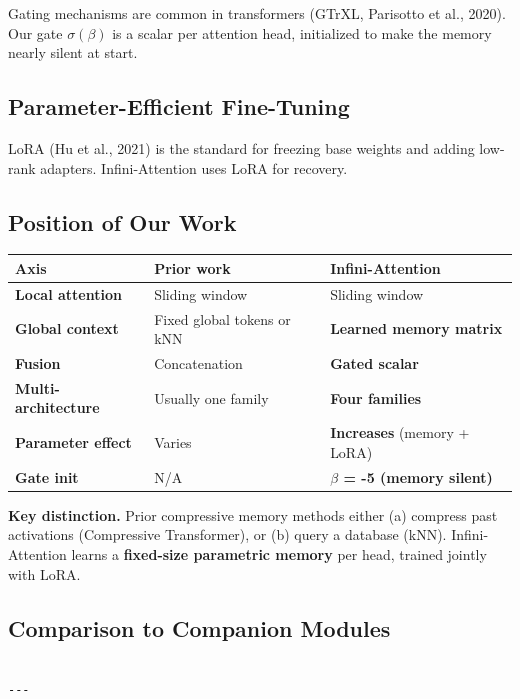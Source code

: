 Gating mechanisms are common in transformers (GTrXL, Parisotto et al., 2020). 
Our gate $\sigma(\beta)$ is a scalar per attention head, initialized to make 
the memory nearly silent at start.

\subsection{Parameter-Efficient Fine-Tuning}

LoRA (Hu et al., 2021) is the standard for freezing base weights and adding 
low-rank adapters. Infini-Attention uses LoRA for recovery.

\subsection{Position of Our Work}

\begin{table}[H]
\centering
\small
\begin{tabular}{lll}
\toprule
\textbf{Axis} & \textbf{Prior work} & \textbf{Infini-Attention} \\
\midrule
\textbf{Local attention} & Sliding window & Sliding window \\
\textbf{Global context} & Fixed global tokens or kNN & \textbf{Learned memory matrix} \\
\textbf{Fusion} & Concatenation & \textbf{Gated scalar} \\
\textbf{Multi-architecture} & Usually one family & \textbf{Four families} \\
\textbf{Parameter effect} & Varies & \textbf{Increases} (memory + LoRA) \\
\textbf{Gate init} & N/A & \textbf{$\beta$ = -5 (memory silent)} \\
\bottomrule
\end{tabular}
\end{table}

\textbf{Key distinction.} Prior compressive memory methods either (a) compress 
past activations (Compressive Transformer), or (b) query a database (kNN). 
Infini-Attention learns a \textbf{fixed-size parametric memory} per head, 
trained jointly with LoRA.

\subsection{Comparison to Companion Modules}

\begin{lstlisting}

---
\end{lstlisting}

